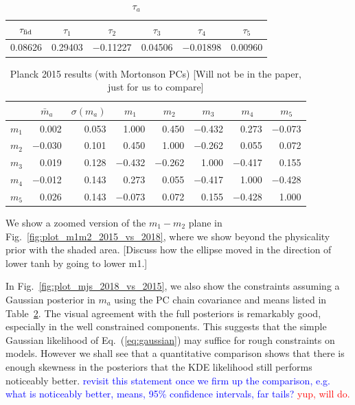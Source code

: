 \documentclass[prd,twocolumn,amsmath,amssymb,floatfix,superscriptaddress,nofootinbib]{revtex4-1}
\newcommand{\wh}[1]{\textcolor{blue}{#1}}
\newcommand{\ch}[1]{\textcolor{red}{#1}}
\begin{document}
\begin{table}[b]
\centering
\caption{$\tau_a$}
\label{tab:PC_stats}
\begin{tabular}{|c | c | c | c | c | c|}
\hline
$\tau_{\rm fid}$ & $\tau_1$  & $\tau_2$ & $\tau_3$ & $\tau_4$ & $\tau_5$ \\ \hline
0.08626 & 0.29403 & $-$0.11227 & 0.04506 & $-$0.01898 & 0.00960 \\
\hline
\end{tabular}
\end{table}
\begin{table}[b]
\centering
\caption{Planck 2015 results (with Mortonson PCs) [Will not be in the paper, just for us to compare] }
\label{tab:PC_stats}
\begin{tabular}{|r | r r@{\hskip 0.06in}|r r r r r|}
\hline
		
			  &  \multicolumn{1}{c}{$\bar m_a$} & \multicolumn{1}{c}{$\sigma(m_a)$}	 & \multicolumn{1}{|c}{$m_1$} & \multicolumn{1}{c}{$m_2$} & \multicolumn{1}{c}{$m_3$} & \multicolumn{1}{c}{$m_4$} & \multicolumn{1}{c|}{$m_5$} 
		\\ \hline

$m_1$ 
	& 0.002 & 0.053 & 1.000 & 0.450 & $-$0.432 & 0.273 & $-$0.073 \\ 
$m_2$ 
	& $-$0.030 &  0.101 & 0.450 & 1.000 & $-$0.262 & 0.055 & 0.072 \\ 
$m_3$ 
	& 0.019 &  0.128 & $-$0.432 & $-$0.262 &1.000 & $-$0.417 & 0.155 \\
$m_4$  
	& $-$0.012 & 0.143 &  0.273 & 0.055 & $-$0.417 & 1.000 & $-$0.428 \\ 
$m_5$ 
	& 0.026 & 0.143 & $-$0.073 & 0.072 & 0.155 & $-$0.428 & 1.000\\ 
\hline
\end{tabular}
\end{table}


We show a zoomed version of the $m_1-m_2$ plane in Fig.~\ref{fig:plot_m1m2_2015_vs_2018}, where we show beyond the physicality prior with the shaded area. [Discuss how the ellipse moved in the direction of lower tanh by going to lower m1.] 


In Fig.~\ref{fig:plot_mjs_2018_vs_2015}, we also show the constraints assuming a Gaussian posterior in $m_a$ using the PC chain covariance and means listed in Table~\ref{tab:PC_stats}.  The visual agreement with the full posteriors is remarkably good, especially in the well constrained components.  This suggests that the simple Gaussian  likelihood of Eq.~(\ref{eq:gaussian}) may suffice for rough constraints on models.    However we shall see that a quantitative comparison shows that there is enough skewness in the posteriors that the KDE likelihood 
still performs noticeably better.  \wh{revisit this 
statement once we firm up the comparison, e.g. what is noticeably better, means, 95\% confidence intervals, far tails?} \ch{yup, will do.}
\end{document}
